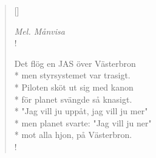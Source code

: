 
\settowidth{\versewidth}{Det flög en JAS över Västerbron}



\begin{verse}[\versewidth]

\flagverse{}
\emph{Mel. Månvisa}\\!

\flagverse{}
Det flög en JAS över Västerbron\\*
men styrsystemet var trasigt.\\*
Piloten sköt ut sig med kanon\\*
för planet svängde så knasigt.\\*
"Jag vill ju uppåt, jag vill ju mer"\\* 
men planet svarte: "Jag vill ju ner"\\* 
mot alla hjon, på Västerbron.\\!




\end{verse}

